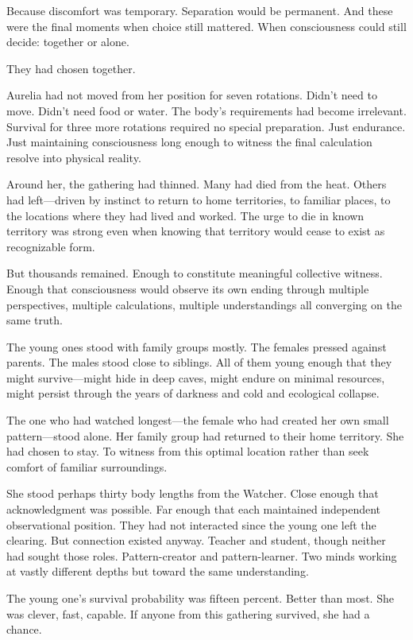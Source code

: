 Because discomfort was temporary. Separation would be permanent. And these were the final moments when choice still mattered. When consciousness could still decide: together or alone.

They had chosen together.

\scenebreak

Aurelia had not moved from her position for seven rotations. Didn't need to move. Didn't need food or water. The body's requirements had become irrelevant. Survival for three more rotations required no special preparation. Just endurance. Just maintaining consciousness long enough to witness the final calculation resolve into physical reality.

Around her, the gathering had thinned. Many had died from the heat. Others had left—driven by instinct to return to home territories, to familiar places, to the locations where they had lived and worked. The urge to die in known territory was strong even when knowing that territory would cease to exist as recognizable form.

But thousands remained. Enough to constitute meaningful collective witness. Enough that consciousness would observe its own ending through multiple perspectives, multiple calculations, multiple understandings all converging on the same truth.

The young ones stood with family groups mostly. The females pressed against parents. The males stood close to siblings. All of them young enough that they might survive—might hide in deep caves, might endure on minimal resources, might persist through the years of darkness and cold and ecological collapse.

The one who had watched longest—the female who had created her own small pattern—stood alone. Her family group had returned to their home territory. She had chosen to stay. To witness from this optimal location rather than seek comfort of familiar surroundings.

She stood perhaps thirty body lengths from the Watcher. Close enough that acknowledgment was possible. Far enough that each maintained independent observational position. They had not interacted since the young one left the clearing. But connection existed anyway. Teacher and student, though neither had sought those roles. Pattern-creator and pattern-learner. Two minds working at vastly different depths but toward the same understanding.

The young one's survival probability was fifteen percent. Better than most. She was clever, fast, capable. If anyone from this gathering survived, she had a chance.

